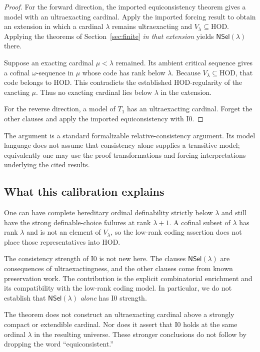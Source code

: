 \documentclass[11pt,letterpaper]{article}
\theoremstyle{definition}
\newcommand{\HOD}{\mathrm{HOD}}
\newcommand{\Izero}{\mathrm{I0}}
\newcommand{\NSel}{\mathsf{NSel}}
\begin{document}
\begin{proof}
For the forward direction, the imported equiconsistency theorem gives a model with an ultraexacting cardinal. Apply the imported forcing result to obtain an extension in which a cardinal $\lambda$ remains ultraexacting and $V_\lambda\subseteq\HOD$. Applying the theorems of Section~\ref{sec:finite} \emph{in that extension} yields $\NSel(\lambda)$ there.

Suppose an exacting cardinal $\mu<\lambda$ remained. Its ambient critical sequence gives a cofinal $\omega$-sequence in $\mu$ whose code has rank below $\lambda$. Because $V_\lambda\subseteq\HOD$, that code belongs to HOD. This contradicts the established HOD-regularity of the exacting $\mu$. Thus no exacting cardinal lies below $\lambda$ in the extension.

For the reverse direction, a model of $T_1$ has an ultraexacting cardinal. Forget the other clauses and apply the imported equiconsistency with $\Izero$.
\end{proof}

The argument is a standard formalizable relative-consistency argument. Its model language does not assume that consistency alone supplies a transitive model; equivalently one may use the proof transformations and forcing interpretations underlying the cited results.

\subsection{What this calibration explains}

One can have complete hereditary ordinal definability strictly below $\lambda$ and still have the strong definable-choice failures at rank $\lambda+1$. A cofinal subset of $\lambda$ has rank $\lambda$ and is not an element of $V_\lambda$, so the low-rank coding assertion does not place those representatives into HOD.

The consistency strength of $\Izero$ is not new here. The clauses $\NSel(\lambda)$ are consequences of ultraexactingness, and the other clauses come from known preservation work. The contribution is the explicit combinatorial enrichment and its compatibility with the low-rank coding model. In particular, we do not establish that $\NSel(\lambda)$ \emph{alone} has $\Izero$ strength.

The theorem does not construct an ultraexacting cardinal above a strongly compact or extendible cardinal. Nor does it assert that $\Izero$ holds at the same ordinal $\lambda$ in the resulting universe. These stronger conclusions do not follow by dropping the word ``equiconsistent.''
\end{document}
